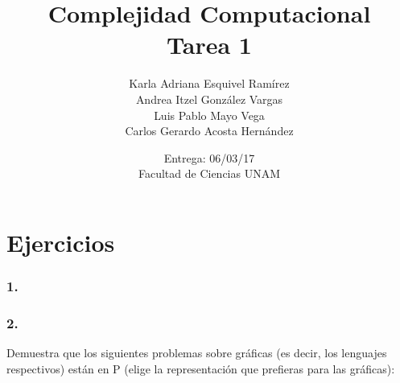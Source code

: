 \documentclass[12pt]{article}
\title{Complejidad Computacional \\ Tarea 1}
\author{Karla Adriana Esquivel Ramírez \\ Andrea Itzel González Vargas\\ Luis Pablo Mayo Vega \\ Carlos Gerardo Acosta Hernández}
\date{Entrega: 06/03/17 \\ Facultad de Ciencias UNAM}
\begin{document}
\maketitle
\section*{Ejercicios}
\subsubsection*{1.}

\subsubsection*{2.}

 Demuestra que los siguientes problemas sobre gráficas (es decir, los lenguajes respectivos) están en P (elige la representación que prefieras para las gráficas):
 
\end{document}
